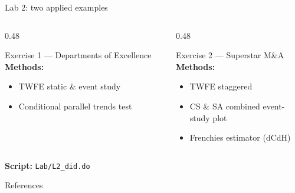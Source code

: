 \documentclass[aspectratio=169, 10pt]{beamer}
\begin{document}
\begin{frame}[shrink=5]{Lab 2: two applied examples}

  \begin{columns}[T]
    \begin{column}{0.48\textwidth}
      \begin{block}{Exercise 1 — Departments of Excellence}
        \textbf{Methods:}
        \begin{itemize}\small
          \item TWFE static \& event study
          \item Conditional parallel trends test
        \end{itemize}
      \end{block}
    \end{column}
    \begin{column}{0.48\textwidth}
      \begin{block}{Exercise 2 — Superstar M\&A}
        \textbf{Methods:}
        \begin{itemize}\small
          \item TWFE staggered
          \item CS \& SA combined event-study plot
          \item Frenchies estimator (dCdH)
        \end{itemize}
      \end{block}
    \end{column}
  \end{columns}

  \bigskip
  \begin{center}
    \textbf{Script:} \texttt{Lab/L2\_did.do} 
  \end{center}


\end{frame}


\begin{frame}[allowframebreaks]{References}
  \small
  
\end{frame}
\end{document}
